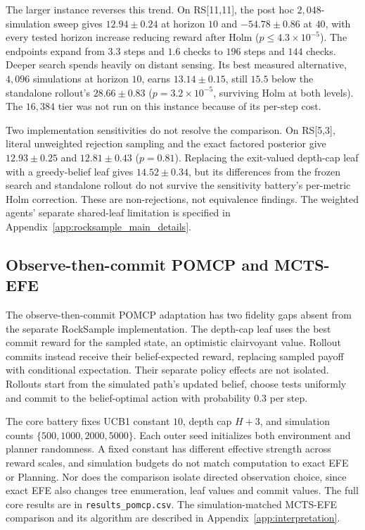 \documentclass[runningheads]{llncs}
\begin{document}
The larger instance reverses this trend. On RS[11,11], the post hoc $2{,}048$-simulation sweep gives $12.94\pm0.24$ at horizon $10$ and $-54.78\pm0.86$ at $40$, with every tested horizon increase reducing reward after Holm ($p\le4.3\times10^{-5}$). The endpoints expand from $3.3$ steps and $1.6$ checks to $196$ steps and $144$ checks. Deeper search spends heavily on distant sensing. Its best measured alternative, $4{,}096$ simulations at horizon $10$, earns $13.14\pm0.15$, still $15.5$ below the standalone rollout's $28.66\pm0.83$ ($p=3.2\times10^{-5}$, surviving Holm at both levels). The $16{,}384$ tier was not run on this instance because of its per-step cost.

Two implementation sensitivities do not resolve the comparison. On RS[5,3], literal unweighted rejection sampling and the exact factored posterior give $12.93\pm0.25$ and $12.81\pm0.43$ ($p=0.81$). Replacing the exit-valued depth-cap leaf with a greedy-belief leaf gives $14.52\pm0.34$, but its differences from the frozen search and standalone rollout do not survive the sensitivity battery's per-metric Holm correction. These are non-rejections, not equivalence findings. The weighted agents' separate shared-leaf limitation is specified in Appendix~\ref{app:rocksample_main_details}.

\subsection{Observe-then-commit POMCP and MCTS-EFE}
\label{app:pomcp}

The observe-then-commit POMCP adaptation \citep{silver2010} has two fidelity gaps absent from the separate RockSample implementation. The depth-cap leaf uses the best commit reward for the sampled state, an optimistic clairvoyant value. Rollout commits instead receive their belief-expected reward, replacing sampled payoff with conditional expectation. Their separate policy effects are not isolated. Rollouts start from the simulated path's updated belief, choose tests uniformly and commit to the belief-optimal action with probability $0.3$ per step.

The core battery fixes UCB1 constant $10$, depth cap $H+3$, and simulation counts $\{500,1000,2000,5000\}$. Each outer seed initializes both environment and planner randomness. A fixed constant has different effective strength across reward scales, and simulation budgets do not match computation to exact EFE or Planning. Nor does the comparison isolate directed observation choice, since exact EFE also changes tree enumeration, leaf values and commit values. The full core results are in \texttt{results\_pomcp.csv}. The simulation-matched MCTS-EFE comparison and its algorithm are described in Appendix~\ref{app:interpretation}.
\end{document}

